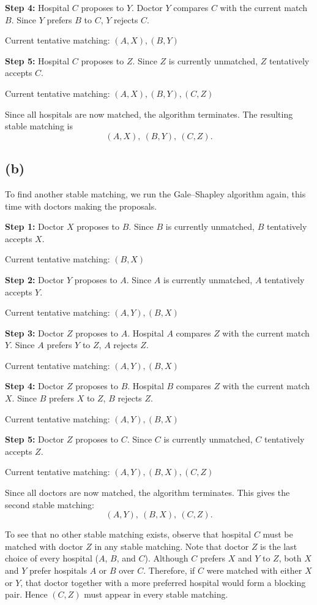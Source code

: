 \documentclass{brockcosc3p03}
\begin{document}
\textbf{Step 4:} Hospital $C$ proposes to $Y$. Doctor $Y$ compares $C$ with the current match $B$. Since $Y$ prefers $B$ to $C$, $Y$ rejects $C$.

Current tentative matching: $(A,X), (B,Y)$

\textbf{Step 5:} Hospital $C$ proposes to $Z$. Since $Z$ is currently unmatched, $Z$ tentatively accepts $C$.

Current tentative matching: $(A,X), (B,Y), (C,Z)$


Since all hospitals are now matched, the algorithm terminates. The resulting stable matching is
\[
(A,X),\ (B,Y),\ (C,Z).
\]

\subsection*{(b)}

To find another stable matching, we run the Gale--Shapley algorithm again, this time with doctors making the proposals.

\textbf{Step 1:} Doctor $X$ proposes to $B$. Since $B$ is currently unmatched, $B$ tentatively accepts $X$.

Current tentative matching: $(B,X)$

\textbf{Step 2:} Doctor $Y$ proposes to $A$. Since $A$ is currently unmatched, $A$ tentatively accepts $Y$.

Current tentative matching: $(A,Y), (B,X)$

\textbf{Step 3:} Doctor $Z$ proposes to $A$. Hospital $A$ compares $Z$ with the current match $Y$. Since $A$ prefers $Y$ to $Z$, $A$ rejects $Z$.

Current tentative matching: $(A,Y), (B,X)$

\textbf{Step 4:} Doctor $Z$ proposes to $B$. Hospital $B$ compares $Z$ with the current match $X$. Since $B$ prefers $X$ to $Z$, $B$ rejects $Z$.

Current tentative matching: $(A,Y), (B,X)$

\textbf{Step 5:} Doctor $Z$ proposes to $C$. Since $C$ is currently unmatched, $C$ tentatively accepts $Z$.

Current tentative matching: $(A,Y), (B,X), (C,Z)$

Since all doctors are now matched, the algorithm terminates. This gives the second stable matching:
\[
(A,Y),\ (B,X),\ (C,Z).
\]

To see that no other stable matching exists, observe that hospital $C$ must be matched with doctor $Z$ in any stable matching. Note that doctor $Z$ is the last choice of every hospital ($A$, $B$, and $C$). Although $C$ prefers $X$ and $Y$ to $Z$, both $X$ and $Y$ prefer hospitals $A$ or $B$ over $C$. Therefore, if $C$ were matched with either $X$ or $Y$, that doctor together with a more preferred hospital would form a blocking pair. Hence $(C,Z)$ must appear in every stable matching.
\end{document}

